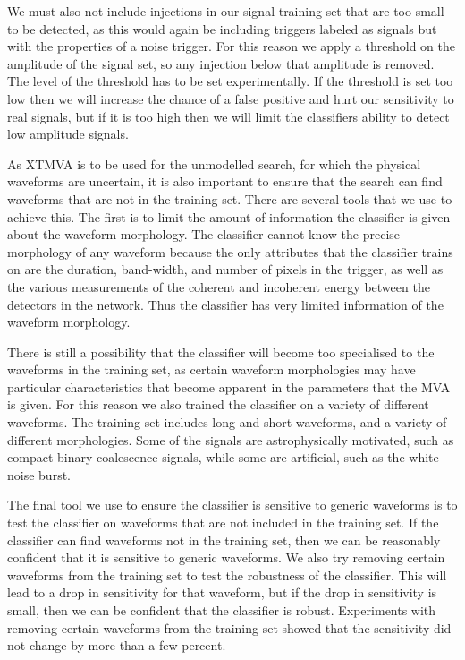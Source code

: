 \documentclass[11pt]{cuthesis}
\begin{document}
We must also not include injections in our signal training set that are too small to be detected, as this would again be including triggers labeled as signals but with the properties of a noise trigger. For this reason we apply a threshold on the amplitude of the signal set, so any injection below that amplitude is removed. The level of the threshold has to be set experimentally. If the threshold is set too low then we will increase the chance of a false positive and hurt our sensitivity to real signals, but if it is too high then we will limit the classifiers ability to detect low amplitude signals. 

As XTMVA is to be used for the unmodelled search, for which the physical waveforms are uncertain, it is also important to ensure that the search can find waveforms that are not in the training set. There are several tools that we use to achieve this. The first is to limit the amount of information the classifier is given about the waveform morphology. The classifier cannot know the precise morphology of any waveform because the only attributes that the classifier trains on are the duration, band-width, and number of pixels in the trigger, as well as the various measurements of the coherent and incoherent energy between the detectors in the network. Thus the classifier has very limited information of the waveform morphology.

There is still a possibility that the classifier will become too specialised to the waveforms in the training set, as certain waveform morphologies may have particular characteristics that become apparent in the parameters that the MVA is given. For this reason we also trained the classifier on a variety of different waveforms. The training set includes long and short waveforms, and a variety of different morphologies. Some of the signals are astrophysically motivated, such as compact binary coalescence signals, while some are artificial, such as the white noise burst. 

The final tool we use to ensure the classifier is sensitive to generic waveforms is to test the classifier on waveforms that are not included in the training set. If the classifier can find waveforms not in the training set, then we can be reasonably confident that it is sensitive to generic waveforms. We also try removing certain waveforms from the training set to test the robustness of the classifier. This will lead to a drop in sensitivity for that waveform, but if the drop in sensitivity is small, then we can be confident that the classifier is robust. Experiments with removing certain waveforms from the training set showed that the sensitivity did not change by more than a few percent.
\end{document}
